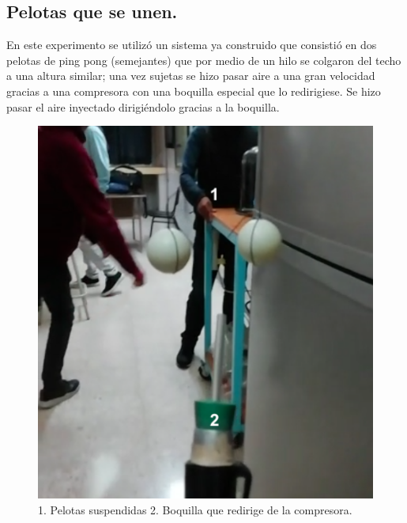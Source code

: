 \documentclass[10pt,a4paper]{article}
\begin{document}
\subsection*{Pelotas que se unen.}
En este experimento se utilizó un sistema ya construido que consistió en dos pelotas de ping pong (semejantes) que por medio de un hilo se colgaron del techo a una altura similar; una vez sujetas se hizo pasar aire a una gran velocidad gracias a una compresora con una boquilla especial que lo redirigiese. Se hizo pasar el aire inyectado dirigiéndolo gracias a la boquilla.
\begin{figure}[H]
\includegraphics[scale=0.3]{pelotas.png}
\centering
\caption{1. Pelotas suspendidas 2. Boquilla que redirige de la compresora.}
\end{figure}
\end{document}
